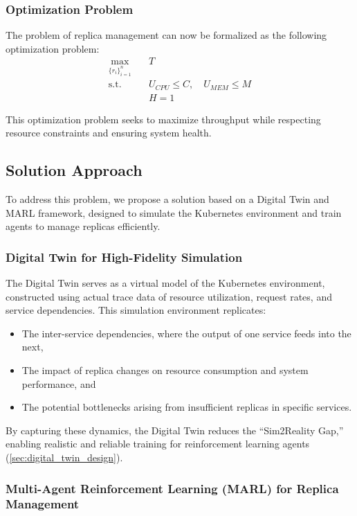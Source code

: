 \documentclass[conference]{IEEEtran}
\begin{document}
\subsubsection{Optimization Problem}

The problem of replica management can now be formalized as the following optimization problem:
\begin{align}
    \max_{\{r_i\}_{i=1}^{n}} & \quad T \\
    \text{s.t.} & \quad U_{CPU} \leq C, \quad U_{MEM} \leq M \\
    & \quad H = 1
\end{align}

This optimization problem seeks to maximize throughput while respecting resource constraints and ensuring system health.

\subsection{Solution Approach}

To address this problem, we propose a solution based on a Digital Twin and MARL framework, designed to simulate the Kubernetes environment and train agents to manage replicas efficiently.

\subsubsection{Digital Twin for High-Fidelity Simulation}

The Digital Twin serves as a virtual model of the Kubernetes environment, constructed using actual trace data of resource utilization, request rates, and service dependencies. This simulation environment replicates:
\begin{itemize}
    \item The inter-service dependencies, where the output of one service feeds into the next,
    \item The impact of replica changes on resource consumption and system performance, and
    \item The potential bottlenecks arising from insufficient replicas in specific services.
\end{itemize}
By capturing these dynamics, the Digital Twin reduces the ``Sim2Reality Gap,'' enabling realistic and reliable training for reinforcement learning agents (\autoref{sec:digital_twin_design}).

\subsubsection{Multi-Agent Reinforcement Learning (MARL) for Replica Management}
\end{document}
